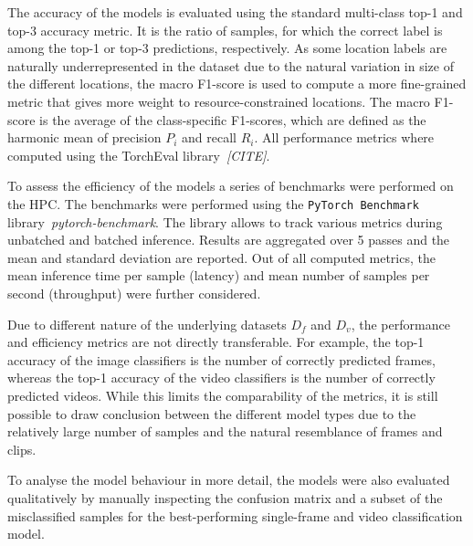 \documentclass[a4paper]{article}
\begin{document}
  The accuracy of the models is evaluated using the standard multi-class top-1
  and top-3 accuracy metric. It is the ratio of samples, for which the correct
  label is among the top-1 or top-3 predictions, respectively. As some location
  labels are naturally underrepresented in the dataset due to the natural
  variation in size of the different locations, the macro F1-score is used to
  compute a more fine-grained metric that gives more weight to
  resource-constrained locations. The macro F1-score is the average of the
  class-specific F1-scores, which are defined as the harmonic mean of precision
  $P_i$ and recall $R_i$. All performance metrics where computed using the
  TorchEval library~\textit{[CITE]}.

  To assess the efficiency of the models a series of benchmarks were performed
  on the HPC. The benchmarks were performed using the \texttt{PyTorch Benchmark}
  library~\textit{pytorch-benchmark}. The library allows to track various
  metrics during unbatched and batched inference. Results are aggregated over 5
  passes and the mean and standard deviation are reported. Out of all computed
  metrics, the mean inference time per sample (latency) and mean number of
  samples per second (throughput) were further considered.

  Due to different nature of the underlying datasets $D_f$ and $D_v$, the
  performance and efficiency metrics are not directly transferable. For example,
  the top-1 accuracy of the image classifiers is the number of correctly
  predicted frames, whereas the top-1 accuracy of the video classifiers is the
  number of correctly predicted videos. While this limits the comparability of
  the metrics, it is still possible to draw conclusion between the different
  model types due to the relatively large number of samples and the natural
  resemblance of frames and clips.

  To analyse the model behaviour in more detail, the models were also evaluated
  qualitatively by manually inspecting the confusion matrix and a subset of the
  misclassified samples for the best-performing single-frame and video
  classification model. 

\end{document}
